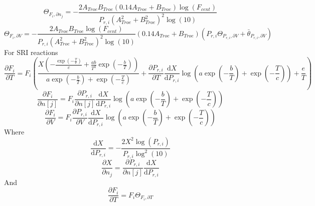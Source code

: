 \documentclass[a4paper,10pt]{article}
\begin{document}
\begin{dmath} \Theta_{F_i, \partial n_j} = - \frac{2 A_{Troe} B_{Troe} \left(0.14 A_{Troe} + B_{Troe}\right) \log{\left (F_{cent} \right )}}{P_{r, i} \left(A_{Troe}^{2} + B_{Troe}^{2}\right)^{2} \log{\left (10 \right )}}\end{dmath} 
\begin{dmath} \Theta_{F_i, \partial V} = - \frac{2 A_{Troe} B_{Troe} \log{\left (F_{cent} \right )}}{P_{r, i} \left(A_{Troe}^{2} + B_{Troe}^{2}\right)^{2} \log{\left (10 \right )}} \left(0.14 A_{Troe} + B_{Troe}\right) \left(P_{r, i} \Theta_{P_{r,i}, \partial V} + \bar{\theta}_{P_{r, i}, \partial V}\right)\end{dmath} 
For SRI reactions
\begin{dmath} \frac{\partial F_{i} }{\partial T } = F_{i} \left(\frac{X \left(- \frac{\operatorname{exp}\left({- \frac{T}{c}}\right)}{c} + \frac{a b}{T^{2}} \operatorname{exp}\left({- \frac{b}{T}}\right)\right)}{a \operatorname{exp}\left({- \frac{b}{T}}\right) + \operatorname{exp}\left({- \frac{T}{c}}\right)} + \frac{\partial P_{r, i} }{\partial T } \frac{\text{d} X }{\text{d} P_{r, i} } \log{\left (a \operatorname{exp}\left({- \frac{b}{T}}\right) + \operatorname{exp}\left({- \frac{T}{c}}\right) \right )} + \frac{e}{T}\right)\end{dmath} 
\begin{dmath} \frac{\partial F_{i} }{\partial n[j] } = F_{i} \frac{\partial P_{r, i} }{\partial n[j] } \frac{\text{d} X }{\text{d} P_{r, i} } \log{\left (a \operatorname{exp}\left({- \frac{b}{T}}\right) + \operatorname{exp}\left({- \frac{T}{c}}\right) \right )}\end{dmath} 
\begin{dmath} \frac{\partial F_{i} }{\partial V } = F_{i} \frac{\partial P_{r, i} }{\partial V } \frac{\text{d} X }{\text{d} P_{r, i} } \log{\left (a \operatorname{exp}\left({- \frac{b}{T}}\right) + \operatorname{exp}\left({- \frac{T}{c}}\right) \right )}\end{dmath} 
Where
\begin{dmath} \frac{\text{d} X }{\text{d} P_{r, i} } = - \frac{2 X^{2} \log{\left (P_{r, i} \right )}}{P_{r, i} \log^{2}{\left (10 \right )}}\end{dmath} 
\begin{dmath} \frac{\partial X}{\partial n_j} = \frac{\partial P_{r, i} }{\partial n[j] } \frac{\text{d} X }{\text{d} P_{r, i} }\end{dmath} 
And
\begin{dmath} \frac{\partial F_{i} }{\partial T } = F_{i} \Theta_{F_i, \partial T}\end{dmath} 
\end{document}
